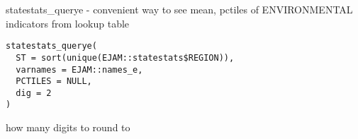 \documentclass[a4paper]{book}
\begin{document}
%
\begin{Description}\relax
statestats\_querye - convenient way to see mean, pctiles of ENVIRONMENTAL indicators from lookup table
\end{Description}
%
\begin{Usage}
\begin{verbatim}
statestats_querye(
  ST = sort(unique(EJAM::statestats$REGION)),
  varnames = EJAM::names_e,
  PCTILES = NULL,
  dig = 2
)
\end{verbatim}
\end{Usage}
%
\begin{Arguments}
\begin{ldescription}
\item[\code{dig}] how many digits to round to
\end{ldescription}
\end{Arguments}
%
\end{document}
